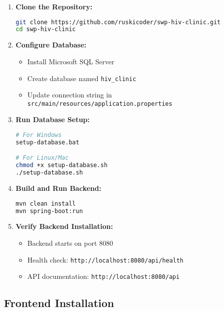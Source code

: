 \documentclass[12pt,a4paper]{article}
\begin{document}
\begin{enumerate}
    \item \textbf{Clone the Repository:}
    \begin{lstlisting}[language=bash]
git clone https://github.com/ruskicoder/swp-hiv-clinic.git
cd swp-hiv-clinic
    \end{lstlisting}
    
    \item \textbf{Configure Database:}
    \begin{itemize}
        \item Install Microsoft SQL Server
        \item Create database named \texttt{hiv\_clinic}
        \item Update connection string in \texttt{src/main/resources/application.properties}
    \end{itemize}
    
    \item \textbf{Run Database Setup:}
    \begin{lstlisting}[language=bash]
# For Windows
setup-database.bat

# For Linux/Mac
chmod +x setup-database.sh
./setup-database.sh
    \end{lstlisting}
    
    \item \textbf{Build and Run Backend:}
    \begin{lstlisting}[language=bash]
mvn clean install
mvn spring-boot:run
    \end{lstlisting}
    
    \item \textbf{Verify Backend Installation:}
    \begin{itemize}
        \item Backend starts on port 8080
        \item Health check: \texttt{http://localhost:8080/api/health}
        \item API documentation: \texttt{http://localhost:8080/api}
    \end{itemize}
\end{enumerate}

\subsection{Frontend Installation}
\end{document}
